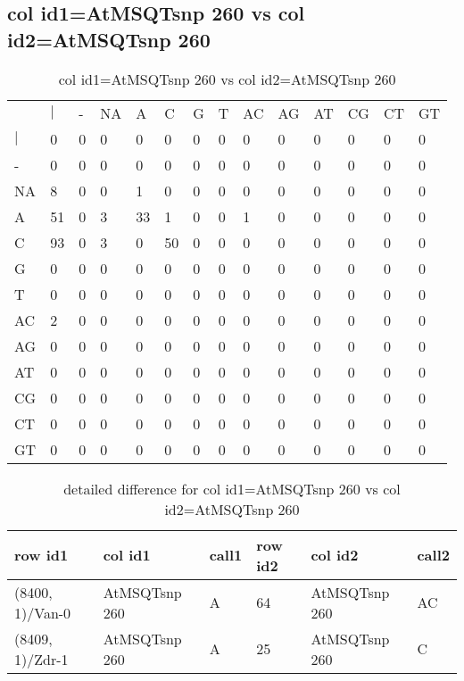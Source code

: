 \subsection{col id1=AtMSQTsnp 260 vs col id2=AtMSQTsnp 260}
\begin{center}
\begin{longtable}{|l|l|l|l|l|l|l|l|l|l|l|l|l|l|}
\caption{col id1=AtMSQTsnp 260 vs col id2=AtMSQTsnp 260} \label{table_dm612}\\
\hline
\\
\hline
&$|$&-&NA&A&C&G&T&AC&AG&AT&CG&CT&GT\\
$|$&0&0&0&0&0&0&0&0&0&0&0&0&0\\
-&0&0&0&0&0&0&0&0&0&0&0&0&0\\
NA&8&0&0&1&0&0&0&0&0&0&0&0&0\\
A&51&0&3&33&1&0&0&1&0&0&0&0&0\\
C&93&0&3&0&50&0&0&0&0&0&0&0&0\\
G&0&0&0&0&0&0&0&0&0&0&0&0&0\\
T&0&0&0&0&0&0&0&0&0&0&0&0&0\\
AC&2&0&0&0&0&0&0&0&0&0&0&0&0\\
AG&0&0&0&0&0&0&0&0&0&0&0&0&0\\
AT&0&0&0&0&0&0&0&0&0&0&0&0&0\\
CG&0&0&0&0&0&0&0&0&0&0&0&0&0\\
CT&0&0&0&0&0&0&0&0&0&0&0&0&0\\
GT&0&0&0&0&0&0&0&0&0&0&0&0&0\\
\hline
\end{longtable}
\end{center}

\begin{center}
\begin{longtable}{|l|l|l|l|l|l|}
\caption{detailed difference for col id1=AtMSQTsnp 260 vs col id2=AtMSQTsnp 260} \label{table_dm613}\\
\hline
row id1&col id1&call1&row id2&col id2&call2\\
\hline
(8400, 1)/Van-0&AtMSQTsnp 260&A&64&AtMSQTsnp 260&AC\\
(8409, 1)/Zdr-1&AtMSQTsnp 260&A&25&AtMSQTsnp 260&C\\
\hline
\end{longtable}
\end{center}

